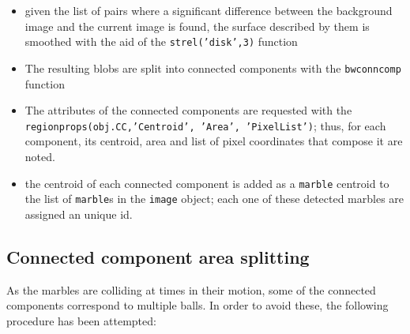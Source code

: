 \documentclass[10pt,a4paper,onecolumn]{report}
\begin{document}
\begin{itemize}
\item given the list of pairs where a significant difference between the background image and the current image is found, the surface described by them is smoothed with the aid of the \texttt{strel('disk',3)} function

\item The resulting blobs are split into connected components with the \texttt{bwconncomp} function

\item The attributes of the connected components are requested with the\\ \texttt{regionprops(obj.CC,'Centroid', 'Area', 'PixelList')}; thus, for each component, its centroid, area and list of pixel coordinates that compose it are noted.

\item the centroid of each connected component is added as a \texttt{marble} centroid to the list of \texttt{marble}s in the \texttt{image} object; each one of these detected marbles are assigned an unique id.
\end{itemize}

\subsection{Connected component area splitting}
As the marbles are colliding at times in their motion, some of the connected components correspond to multiple balls. In order to avoid these, the following procedure has been attempted:
\end{document}
